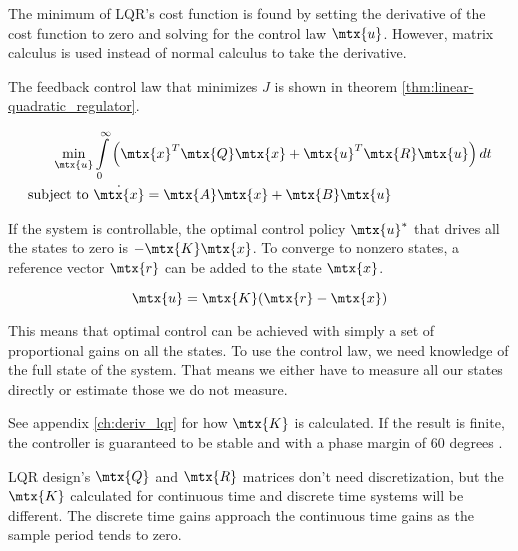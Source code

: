 The minimum of LQR's cost function is found by setting the derivative of the
cost function to zero and solving for the \gls{control law} $\mtx{u}$. However,
matrix calculus is used instead of normal calculus to take the derivative.

The feedback \gls{control law} that minimizes $J$ is shown in theorem
\ref{thm:linear-quadratic_regulator}.
\begin{theorem}
  \label{thm:linear-quadratic_regulator}

  \begin{align}
    \min_{\mtx{u}} &\int\limits_0^\infty \left(\mtx{x}^T\mtx{Q}\mtx{x} +
      \mtx{u}^T\mtx{R}\mtx{u}\right) dt \nonumber \\
    \text{subject to } &\dot{\mtx{x}} = \mtx{A}\mtx{x} + \mtx{B}\mtx{u}
  \end{align}

  If the \gls{system} is controllable, the optimal control policy $\mtx{u}^*$
  that drives all the \glspl{state} to zero is $-\mtx{K}\mtx{x}$. To converge to
  nonzero \glspl{state}, a \gls{reference} vector $\mtx{r}$ can be added to the
  \gls{state} $\mtx{x}$.

  \begin{equation}
    \mtx{u} = \mtx{K}(\mtx{r} - \mtx{x})
  \end{equation}
\end{theorem}

This means that optimal control can be achieved with simply a set of
proportional gains on all the \glspl{state}. To use the \gls{control law}, we
need knowledge of the full \gls{state} of the \gls{system}. That means we either
have to measure all our \glspl{state} directly or estimate those we do not
measure.

See appendix \ref{ch:deriv_lqr} for how $\mtx{K}$ is calculated. If the result
is finite, the controller is guaranteed to be stable and
 with a \gls{phase margin} of 60 degrees
\cite{bib:lqr_phase_margin}.
\begin{remark}
  LQR design's $\mtx{Q}$ and $\mtx{R}$ matrices don't need \gls{discretization},
  but the $\mtx{K}$ calculated for continuous time and discrete time
  \glspl{system} will be different. The discrete time gains approach the
  continuous time gains as the sample period tends to zero.
\end{remark}

